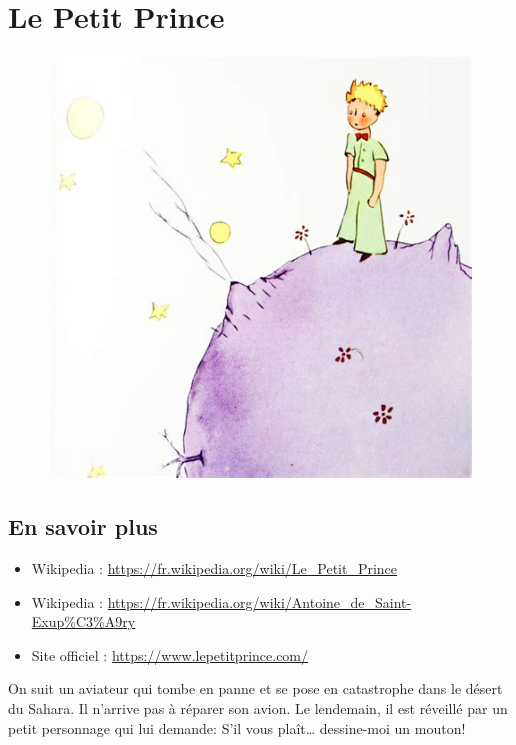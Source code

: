\newpage

\section*{Le Petit Prince}

\begin{multicols}{2}

  \begin{figure}[H]
    \centering
    \includegraphics[width=0.8\linewidth]{4x5-calcul-litteral/pp.png}
  \end{figure}

\subsection*{En savoir plus}

\begin{itemize}
\item Wikipedia : \url{https://fr.wikipedia.org/wiki/Le_Petit_Prince}
\item Wikipedia : \url{https://fr.wikipedia.org/wiki/Antoine_de_Saint-Exup%C3%A9ry}
\item Site officiel : \url{https://www.lepetitprince.com/}
\end{itemize}


On suit un aviateur qui tombe en panne et se pose en catastrophe dans le désert du Sahara. Il n’arrive pas à réparer son avion. Le lendemain, il est réveillé par un petit personnage qui lui demande: \og S'il vous plaît… dessine-moi un mouton! \fg 

\end{multicols}

